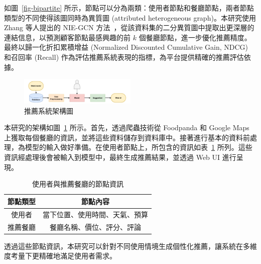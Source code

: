 如圖~\ref{fig-bipartite} 所示，節點可以分為兩類：使用者節點和餐廳節點，兩者節點類型的不同使得該圖同時為異質圖 (attributed heterogeneous graph)。本研究使用 Zhang 等人提出的 NIE-GCN 方法~\cite{NIE-GCN}，從該資料集的二分異質圖中提取出更深層的連結信息，以預測顧客節點最感興趣的前 $k$ 個餐廳節點，進一步優化推薦精度。最終以歸一化折扣累積增益 (Normalized Discounted Cumulative Gain, NDCG) 和召回率 (Recall) 作為評估推薦系統表現的指標，為平台提供精確的推薦評估依據。
\begin{figure}[tbh]
    \centering
    \includegraphics[width=0.5\textwidth]{img/flowg2.pdf}
    \caption{推薦系統架構圖}
    \label{fig-flowchart}
\end{figure}
本研究的架構如圖~\ref{fig-flowchart} 所示。首先，透過爬蟲技術從 Foodpanda 和 Google Maps 上獲取每個餐廳的資訊，並將這些資料儲存到資料庫中。接著進行基本的資料前處理，為模型的輸入做好準備。在使用者節點上，所包含的資訊如表~\ref{node-conetent} 所列。這些資訊經處理後會被輸入到模型中，最終生成推薦結果，並透過 Web UI 進行呈現。
\begin{table}[htbp]
    \centering
    \renewcommand{\arraystretch}{1.15}
    \setlength{\tabcolsep}{7.5pt}
    \begin{tabular}{|c|c|}
    \hline
    \textbf{節點類型} & \textbf{節點內容} \\ \hline
    使用者 & 當下位置、使用時間、天氣、預算 \\ \hline
    推薦餐廳 & 餐廳名稱、價位、評分、評論 \\ \hline
    \end{tabular}
    \caption{使用者與推薦餐廳的節點資訊}
    \label{node-conetent}
\end{table}
透過這些節點資訊，本研究可以針對不同使用情境生成個性化推薦，讓系統在多維度考量下更精確地滿足使用者需求。





    